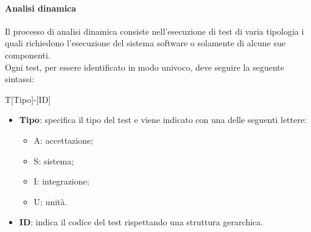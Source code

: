 \paragraph{Analisi dinamica}\Spazio
Il processo di analisi dinamica consiste nell'esecuzione di test di varia tipologia i quali richiedono l'esecuzione del sistema software o solamente di alcune sue componenti. \\
Ogni test, per essere identificato in modo univoco, deve seguire la seguente sintassi:
\begin{center}
	T[Tipo]-[ID]
\end{center}
\begin{itemize}
	\item \textbf{Tipo}: specifica il tipo del test	e viene indicato con una delle seguenti lettere:
	\begin{itemize}
		\item A: accettazione;
		\item S: sistema;
		\item I: integrazione;
		\item U: unità.
	\end{itemize}
	\item \textbf{ID}: indica il codice del test rispettando una struttura gerarchica.	
\end{itemize}

